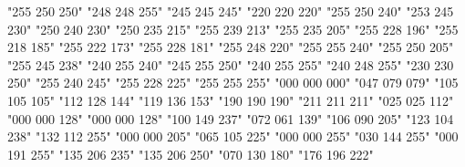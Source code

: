                      {"255 250 250"}
              {"248 248 255"}
              {"245 245 245"}
                {"220 220 220"}
             {"255 250 240"}
                 {"253 245 230"}
                    {"250 240 230"}
            {"250 235 215"}
              {"255 239 213"}
          {"255 235 205"}
                   {"255 228 196"}
               {"255 218 185"}
             {"255 222 173"}
                 {"255 228 181"}
                 {"255 248 220"}
                    {"255 255 240"}
            {"255 250 205"}
                 {"255 245 238"}
                 {"240 255 240"}
               {"245 255 250"}
                    {"240 255 255"}
               {"240 248 255"}
                 {"230 230 250"}
           {"255 240 245"}
               {"255 228 225"}
                    {"255 255 255"}
                    {"000 000 000"}
          {"047 079 079"}
                 {"105 105 105"}
               {"112 128 144"}
         {"119 136 153"}
               {"190 190 190"}
               {"211 211 211"}
            {"025 025 112"}
                     {"000 000 128"}
                {"000 000 128"}
          {"100 149 237"}
          {"072 061 139"}
               {"106 090 205"}
        {"123 104 238"}
         {"132 112 255"}
              {"000 000 205"}
               {"065 105 225"}
                     {"000 000 255"}
              {"030 144 255"}
            {"000 191 255"}
                 {"135 206 235"}
           {"135 206 250"}
               {"070 130 180"}
         {"176 196 222"}
